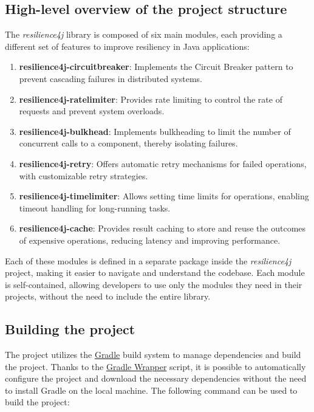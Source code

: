 \subsection{High-level overview of the project structure}

The \textit{resilience4j} library is composed of six main modules, each providing a different set of features to improve resiliency in Java applications:

\begin{enumerate}
	\item \textbf{resilience4j-circuitbreaker}: Implements the Circuit Breaker pattern to prevent cascading failures in distributed systems.
	\item \textbf{resilience4j-ratelimiter}: Provides rate limiting to control the rate of requests and prevent system overloads.
	\item \textbf{resilience4j-bulkhead}: Implements bulkheading to limit the number of concurrent calls to a component, thereby isolating failures.
	\item \textbf{resilience4j-retry}: Offers automatic retry mechanisms for failed operations, with customizable retry strategies.
	\item \textbf{resilience4j-timelimiter}: Allows setting time limits for operations, enabling timeout handling for long-running tasks.
	\item \textbf{resilience4j-cache}: Provides result caching to store and reuse the outcomes of expensive operations, reducing latency and improving performance.
\end{enumerate}

Each of these modules is defined in a separate package inside the \textit{resilience4j} project, making it easier to navigate and understand the codebase. Each module is self-contained, allowing developers to use only the modules they need in their projects, without the need to include the entire library.

\subsection{Building the project}

The project utilizes the \href{}{Gradle} build system to manage dependencies and build the project. Thanks to the \href{}{Gradle Wrapper} script, it is possible to automatically configure the project and download the necessary dependencies without the need to install Gradle on the local machine. The following command can be used to build the project:


